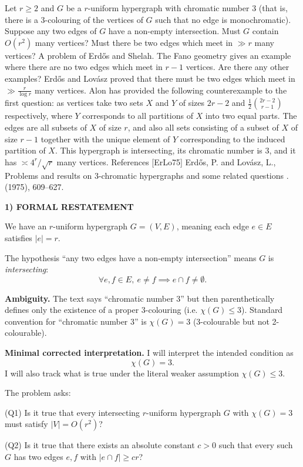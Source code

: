 Let $r\geq 2$ and $G$ be a $r$-uniform hypergraph with chromatic number $3$ (that is, there is a $3$-colouring of the vertices of $G$ such that no edge is monochromatic). Suppose any two edges of $G$ have a non-empty intersection. Must $G$ contain $O(r^2)$ many vertices? Must there be two edges which meet in $\gg r$ many vertices? A problem of Erd\H{o}s and Shelah. The Fano geometry gives an example where there are no two edges which meet in $r-1$ vertices. Are there any other examples? Erd\H{o}s and Lov\'{a}sz \cite{ErLo75} proved that there must be two edges which meet in $\gg \frac{r}{\log r}$ many vertices. Alon has provided the following counterexample to the first question: as vertices take two sets $X$ and $Y$ of sizes $2r-2$ and $\frac{1}{2}\binom{2r-2}{r-1}$ respectively, where $Y$ corresponds to all partitions of $X$ into two equal parts. The edges are all subsets of $X$ of size $r$, and also all sets consisting of a subset of $X$ of size $r-1$ together with the unique element of $Y$ corresponding to the induced partition of $X$. This hypergraph is intersecting, its chromatic number is $3$, and it has $\asymp 4^r/\sqrt{r}$ many vertices. References [ErLo75] Erd\H{o}s, P. and Lov\'{a}sz, L., Problems and results on {$3$}-chromatic hypergraphs and some related questions . (1975), 609--627.

\medskip
\noindent\textbf{1) FORMAL RESTATEMENT}

We have an $r$-uniform hypergraph $G=(V,E)$, meaning each edge $e\in E$ satisfies $|e|=r$.

The hypothesis ``any two edges have a non-empty intersection'' means $G$ is \emph{intersecting}:
\[
\forall e,f\in E,\ e\neq f \implies e\cap f\neq \emptyset.
\]

\textbf{Ambiguity.} The text says ``chromatic number $3$'' but then parenthetically defines only the existence of a proper $3$-colouring (i.e. $\chi(G)\le 3$). Standard convention for ``chromatic number $3$'' is $\chi(G)=3$ (3-colourable but not 2-colourable).

\textbf{Minimal corrected interpretation.} I will interpret the intended condition as
\[
\chi(G)=3.
\]
I will also track what is true under the literal weaker assumption $\chi(G)\le 3$.

The problem asks:

(Q1) Is it true that every intersecting $r$-uniform hypergraph $G$ with $\chi(G)=3$ must satisfy $|V|=O(r^2)$?

(Q2) Is it true that there exists an absolute constant $c>0$ such that every such $G$ has two edges $e,f$ with $|e\cap f|\ge c r$?

